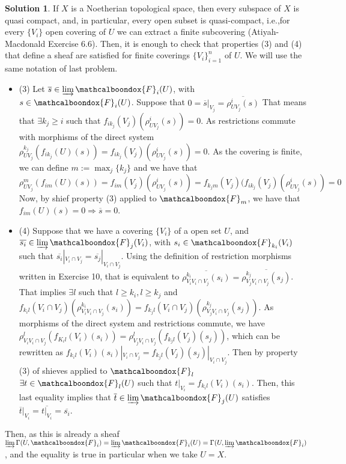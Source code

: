 \documentclass[12pt]{article}
\newcommand{\imp}{\ensuremath{\Rightarrow}}
\theoremstyle{definition}
\newtheorem*{sol}{Solution}
\newcommand{\sF}{\ensuremath{\mathcalboondox{F}}}
\begin{document}
\begin{sol}
	If $X$ is a Noetherian topological space, then every subspace of $X$ is quasi compact, and, in particular, every open subset is quasi-compact, i.e.,for every $\{V_i\}$ open covering of $U$ we can extract a finite subcovering (Atiyah-Macdonald Exercise 6.6). Then, it is enough to check that properties (3) and (4) that define a sheaf are satisfied for finite coverings $\{V_i\}_{i = 1}^n$ of $U$. We will use the same notation of last problem.
	\begin{itemize}
		\item (3) Let $\overline{s} \in \varinjlim \sF_i(U)$, with $s \in \sF_i(U)$. Suppose that $0 = \overline{s}|_{V_j} = \overline{\rho^i_{UV_j}(s)}$ That means that $\exists k_j \geq i$ such that $f_{i k_j}(V_j)(\rho^i_{UV_j}(s)) = 0$. As restrictions commute with morphisms of the direct system $\rho^{k_j}_{UV_j}(f_{ik_j}(U)(s)) = f_{i k_j}(V_j)(\rho^i_{UV_j}(s)) = 0$. As the covering is finite, we can define $m := \max_j\{k_j\}$ and we have that 
		\[
			\rho^m_{UV_j}(f_{im}(U)(s)) = f_{im}(V_j)(\rho^i_{UV_j}(s)) = f_{k_j m}(V_j)(f_{i k_j}(V_j)(\rho^i_{UV_j}(s)) = 0
		\]
		Now, by shief property (3) applied to $\sF_m$, we have that $f_{im}(U)(s) = 0 \imp \overline{s} = 0$.

		\item (4) Suppose that we have a covering $\{V_i\}$ of a open set $U$, and $\overline{s_i} \in \varinjlim \sF_j(V_i)$, with $s_i \in \sF_{k_i}(V_i)$ such that $\overline{s_i}|_{V_i \cap V_j} = \overline{s_j}|_{V_i \cap V_j}$. Using the definition of restriction morphisms written in Exercise 10, that is equivalent to $\overline{\rho^{k_i}_{V_i V_i \cap V_j}(s_i)} = \overline{\rho^{k_j}_{V_j V_i \cap V_j}(s_j)}$. That implies $\exists l$ such that $l \geq k_i, l \geq k_j$ and $f_{k_i l}(V_i \cap V_j)(\rho^{k_i}_{V_i V_i \cap V_j} (s_i)) =  f_{k_j l}(V_i \cap V_j)(\rho^{k_j}_{V_j V_i \cap V_j} (s_j))$. As morphisms of the direct system and restrictions commute, we have $\rho^l_{V_i V_i \cap V_j}(f_{K_i l}(V_i)(s_i)) = \rho^l_{V_j V_i \cap V_j}(f_{k_j l}(V_j)(s_j))$, which can be rewritten as $f_{k_i l}(V_i)(s_i)|_{V_i \cap V_j} = f_{k_j l}(V_j)(s_j)|_{V_i \cap V_j}$. Then by property (3) of shieves applied to $\sF_l$ $\exists t \in \sF_l(U)$ such that $t|_{V_i} = f_{k_i l}(V_i)(s_i)$. Then, this last equality implies that $\overline{t} \in \varinjlim \sF_j (U)$ satisfies $\overline{t}|_{V_i} = \overline{t|_{V_i}} = \overline{s_i}$.
	\end{itemize}
	Then, as this is already a sheaf $\varinjlim \Gamma(U, \sF_i) = \varinjlim \sF_i(U) = \Gamma(U, \varinjlim \sF_i)$, and the equality is true in particular when we take $U = X$.
\end{sol}
\end{document}
